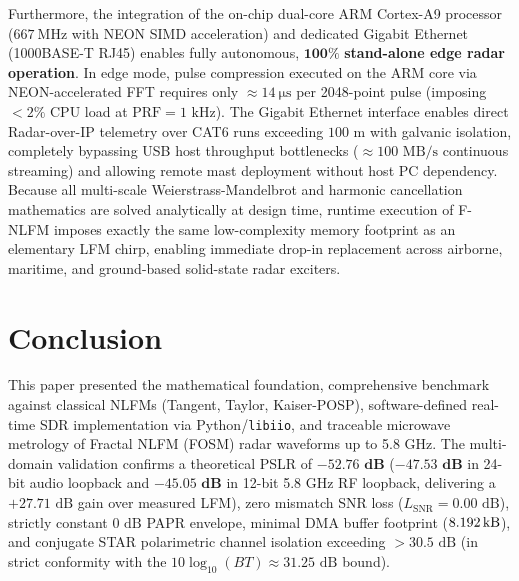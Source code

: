 \documentclass[journal,compsoc]{IEEEtran}
\begin{document}
Furthermore, the integration of the on-chip dual-core ARM Cortex-A9 processor ($\SI{667}{\mega\hertz}$ with NEON SIMD acceleration) and dedicated Gigabit Ethernet (1000BASE-T RJ45) enables fully autonomous, $\mathbf{100\%}$ \textbf{stand-alone edge radar operation}. In edge mode, pulse compression executed on the ARM core via NEON-accelerated FFT requires only $\approx \SI{14}{\micro\second}$ per 2048-point pulse (imposing $<2\%$ CPU load at $\text{PRF} = 1\text{ kHz}$). The Gigabit Ethernet interface enables direct Radar-over-IP telemetry over CAT6 runs exceeding $100\text{ m}$ with galvanic isolation, completely bypassing USB host throughput bottlenecks ($\approx 100\text{ MB/s}$ continuous streaming) and allowing remote mast deployment without host PC dependency. Because all multi-scale Weierstrass-Mandelbrot and harmonic cancellation mathematics are solved analytically at design time, runtime execution of F-NLFM imposes exactly the same low-complexity memory footprint as an elementary LFM chirp, enabling immediate drop-in replacement across airborne, maritime, and ground-based solid-state radar exciters.

\section{Conclusion}
This paper presented the mathematical foundation, comprehensive benchmark against classical NLFMs (Tangent, Taylor, Kaiser-POSP), software-defined real-time SDR implementation via Python/\texttt{libiio}, and traceable microwave metrology of Fractal NLFM (FOSM) radar waveforms up to 5.8 GHz. The multi-domain validation confirms a theoretical PSLR of $\mathbf{-52.76\text{ dB}}$ ($\mathbf{-47.53\text{ dB}}$ in 24-bit audio loopback and $\mathbf{-45.05\text{ dB}}$ in 12-bit 5.8 GHz RF loopback, delivering a $+27.71\text{ dB}$ gain over measured LFM), zero mismatch SNR loss ($L_{\text{SNR}} = 0.00\text{ dB}$), strictly constant $0\text{ dB}$ PAPR envelope, minimal DMA buffer footprint ($\SI{8.192}{\kilo\byte}$), and conjugate STAR polarimetric channel isolation exceeding $>30.5\text{ dB}$ (in strict conformity with the $10\log_{10}(BT) \approx 31.25\text{ dB}$ bound).



\end{document}
